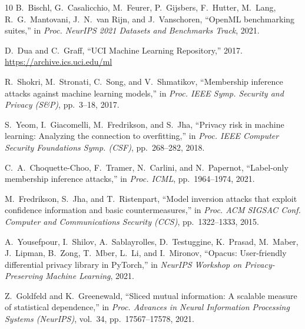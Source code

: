 \documentclass[11pt]{article}
\begin{document}
\begin{thebibliography}{10}
B.~Bischl, G.~Casalicchio, M.~Feurer, P.~Gijsbers, F.~Hutter,
M.~Lang, R.~G.~Mantovani, J.~N.~van Rijn, and J.~Vanschoren,
``{OpenML} benchmarking suites,''
in \emph{Proc. NeurIPS 2021 Datasets and Benchmarks Track},
2021.

D.~Dua and C.~Graff,
``{UCI} Machine Learning Repository,''
2017.
\url{https://archive.ics.uci.edu/ml}

R.~Shokri, M.~Stronati, C.~Song, and V.~Shmatikov,
``Membership inference attacks against machine learning models,''
in \emph{Proc. IEEE Symp. Security and Privacy (S\&P)},
pp.~3--18, 2017.

S.~Yeom, I.~Giacomelli, M.~Fredrikson, and S.~Jha,
``Privacy risk in machine learning: Analyzing the connection to
overfitting,''
in \emph{Proc. IEEE Computer Security Foundations Symp. (CSF)},
pp.~268--282, 2018.

C.~A.~Choquette-Choo, F.~Tramer, N.~Carlini, and N.~Papernot,
``Label-only membership inference attacks,''
in \emph{Proc. ICML}, pp.~1964--1974, 2021.

M.~Fredrikson, S.~Jha, and T.~Ristenpart,
``Model inversion attacks that exploit confidence information and
basic countermeasures,''
in \emph{Proc. ACM SIGSAC Conf. Computer and Communications Security (CCS)},
pp.~1322--1333, 2015.

A.~Yousefpour, I.~Shilov, A.~Sablayrolles, D.~Testuggine,
K.~Prasad, M.~Maber, J.~Lipman, B.~Zong, T.~Mber, L.~Li, and
I.~Mironov,
``{Opacus}: User-friendly differential privacy library in {PyTorch},''
in \emph{NeurIPS Workshop on Privacy-Preserving Machine Learning}, 2021.

Z.~Goldfeld and K.~Greenewald,
``Sliced mutual information: A scalable measure of statistical
dependence,''
in \emph{Proc. Advances in Neural Information Processing Systems (NeurIPS)},
vol.~34, pp.~17567--17578, 2021.

\end{thebibliography}
\end{document}
